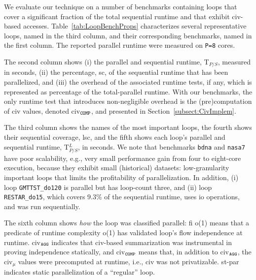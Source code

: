 \documentclass{sig-alternate}
\begin{document}
We evaluate our technique on a number of benchmarks containing loops that cover a significant
fraction of the total sequential runtime and that exhibit {\sc civ}-based accesses.
%
Table~\ref{tab:LoopBenchProps} characterizes several representative loops, named in 
the third column, and their corresponding benchmarks, named in the first column.
The reported parallel runtime were measured on {\tt P=8} cores.
%

The second column shows 
(i)   the parallel and sequential runtime, T$_{P/S}$, measured in seconds,
(ii)  the percentage, {\sc sc}, of the sequential runtime that has been parallelized, and 
(iii) the overhead of the associated runtime tests, if any, which is represented as percentage of
        the total-parallel runtime. With our benchmarks, the only runtime test that introduces
        non-negligible overhead is the (pre)computation of {\sc civ} values, 
        denoted {\sc civ}$_{\tt{}COMP}$, and presented in Section~\ref{subsect:CivImplem}.   

The third column shows the names of the most important loops,
the fourth shows their sequential coverage, {\sc lsc}, and the
fifth shows each loop's parallel and sequential runtime, T$_{P/S}^L$, in seconds.
%
We note that benchmarks {\tt bdna} and {\tt nasa7} have poor scalability, e.g., very small
performance gain from four to eight-core execution, because they exhibit
small (historical) datasets: low-granularity important loops that limits the 
profitability of parallelization.
In addition, (i) loop {\tt GMTTST\_do120} 
is parallel but has loop-count three, and (ii) loop {\tt RESTAR\_do15},
which covers $9.3\%$ of the sequential runtime, uses {\sc io} operations,
and was run sequentially. 

The sixth column shows {\em how} the loop was classified parallel: {\sc fi} {\sc o(1)}
means that a predicate of runtime complexity {\sc o(1)} has validated loop's flow
independence at runtime. {\sc civ}$_{\tt{}AGG}$ indicates that {\sc civ}-based summarization 
was instrumental in proving independence statically, and {\sc civ}$_{\tt{}COMP}$ means that,
in addition to {\sc civ}$_{\tt{}AGG}$, the {\sc civ}$_\mu$ values were precomputed
at runtime, i.e., {\sc civ} was not privatizable.  {\sc st-par} indicates static
parallelization of a ``regular'' loop. 
\end{document}
